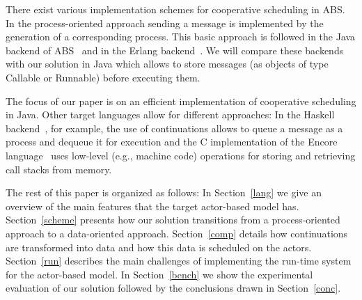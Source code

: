 There exist various implementation schemes for cooperative scheduling in ABS.
In the process-oriented approach sending a message is implemented by the generation of a corresponding process. This basic approach is followed in the Java backend of ABS~\cite{abs,Schafer} and in the Erlang backend~\cite{Erlang}. We will compare these backends with our solution in Java which allows to store messages (as objects of type Callable or Runnable) before executing them.

The focus of our paper is on an efficient implementation of cooperative scheduling in Java.
Other target languages allow for different approaches:
In the Haskell backend~\cite{Haskell}, for example, the use of continuations allows
to queue a message as a process and dequeue it for execution and the C implementation of the
Encore language~\cite{Encore} uses low-level (e.g., machine code) operations for
storing and retrieving call stacks from memory.

The rest of this paper is organized as follows: In Section~\ref{lang} we give an overview of the main features that the target actor-based model has. Section~\ref{scheme} presents how our solution transitions from a process-oriented approach to a data-oriented approach. Section~\ref{comp} details how continuations are transformed into data and how this data is scheduled on the actors. Section~\ref{run} describes the main challenges of implementing the run-time system for the actor-based model. In Section~\ref{bench} we show the experimental evaluation of our solution followed by the conclusions drawn in Section~\ref{conc}.






